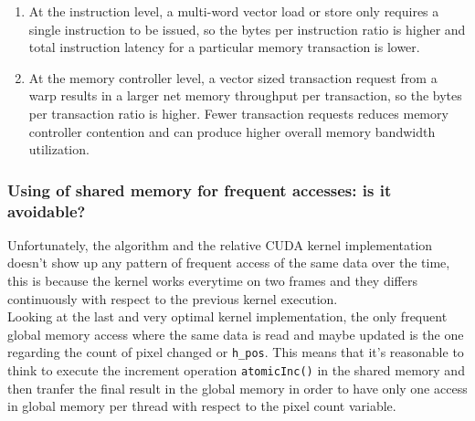 \documentclass[paper=a4, fontsize=10pt]{scrartcl}	%
\begin{document}
	\begin{enumerate}
		\item At the instruction level, a multi-word vector load or store only requires a single instruction to be issued, so the bytes per instruction ratio is higher and total instruction latency for a particular memory transaction is lower.
		\item At the memory controller level, a vector sized transaction request from a warp results in a larger net memory throughput per transaction, so the bytes per transaction ratio is higher. Fewer transaction requests reduces memory controller contention and can produce higher overall memory bandwidth utilization.
	\end{enumerate}

	\subsubsection{Using of shared memory for frequent accesses: is it avoidable?}

	Unfortunately, the algorithm and the relative CUDA kernel implementation doesn't show up any pattern of frequent access of the same data over the time, this is because the kernel works everytime on two frames and they differs continuously with respect to the previous kernel execution. \\

	Looking at the last and very optimal kernel implementation, the only frequent global memory access where the same data is read and maybe updated is the one regarding the count of pixel changed or \texttt{h\_pos}. This means that it's reasonable to think to execute the increment operation \texttt{atomicInc()} in the shared memory and then tranfer the final result in the global memory in order to have only one access in global memory per thread with respect to the pixel count variable.\\
\end{document}
